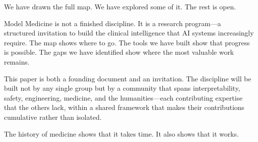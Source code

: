 \documentclass[11pt]{article}
\begin{document}
We have drawn the full map. We have explored some of it. The rest is open.

Model Medicine is not a finished discipline. It is a research program---a structured invitation to build the clinical intelligence that AI systems increasingly require. The map shows where to go. The tools we have built show that progress is possible. The gaps we have identified show where the most valuable work remains.

This paper is both a founding document and an invitation. The discipline will be built not by any single group but by a community that spans interpretability, safety, engineering, medicine, and the humanities---each contributing expertise that the others lack, within a shared framework that makes their contributions cumulative rather than isolated.

The history of medicine shows that it takes time. It also shows that it works.


\end{document}
